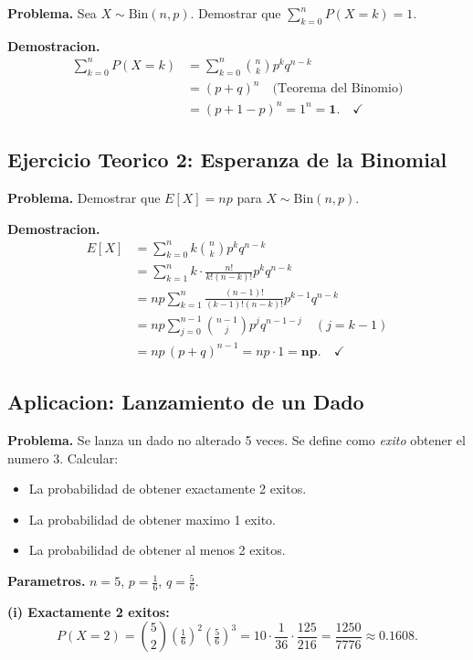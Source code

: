 \documentclass[12pt,a4paper]{article}
\begin{document}
\textbf{Problema.} Sea $X \sim \mathrm{Bin}(n, p)$. Demostrar que $\displaystyle\sum_{k=0}^{n} P(X=k) = 1$.

\textbf{Demostracion.}
\begin{align*}
  \sum_{k=0}^{n} P(X=k)
  &= \sum_{k=0}^{n} \binom{n}{k} p^k q^{n-k} \\
  &= (p + q)^n \quad \text{(Teorema del Binomio)} \\
  &= (p + 1 - p)^n = 1^n = \mathbf{1}. \quad \checkmark
\end{align*}

\subsection{Ejercicio Teorico 2: Esperanza de la Binomial}

\textbf{Problema.} Demostrar que $E[X] = np$ para $X \sim \mathrm{Bin}(n,p)$.

\textbf{Demostracion.}
\begin{align*}
  E[X] &= \sum_{k=0}^{n} k\binom{n}{k} p^k q^{n-k} \\
       &= \sum_{k=1}^{n} k\cdot\frac{n!}{k!(n-k)!} p^k q^{n-k} \\
       &= np \sum_{k=1}^{n} \frac{(n-1)!}{(k-1)!(n-k)!} p^{k-1} q^{n-k} \\
       &= np \sum_{j=0}^{n-1} \binom{n-1}{j} p^{j} q^{n-1-j} \quad (j = k-1)\\
       &= np\,(p+q)^{n-1} = np \cdot 1 = \mathbf{np}. \quad \checkmark
\end{align*}

\subsection{Aplicacion: Lanzamiento de un Dado}

\textbf{Problema.} Se lanza un dado no alterado 5 veces. Se define como \emph{exito}
obtener el numero 3. Calcular:
\begin{itemize}
  \item[(i)]   La probabilidad de obtener exactamente 2 exitos.
  \item[(ii)]  La probabilidad de obtener maximo 1 exito.
  \item[(iii)] La probabilidad de obtener al menos 2 exitos.
\end{itemize}

\textbf{Parametros.} $n = 5$, $p = \tfrac{1}{6}$, $q = \tfrac{5}{6}$.

\bigskip
\textbf{(i) Exactamente 2 exitos:}
\[
  P(X = 2) = \binom{5}{2}\!\left(\tfrac{1}{6}\right)^{\!2}\!\left(\tfrac{5}{6}\right)^{\!3}
  = 10 \cdot \frac{1}{36} \cdot \frac{125}{216}
  = \frac{1250}{7776} \approx \mathbf{0.1608}.
\]
\end{document}
